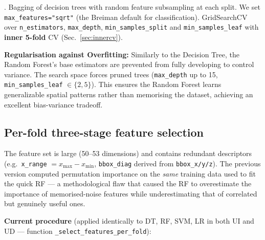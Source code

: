 \documentclass[11pt,a4paper]{article}
\begin{document}
\cite{breiman2001randomforests}. Bagging of decision trees with
random feature subsampling at each split. We set
\verb|max_features="sqrt"| (the Breiman default for classification).
GridSearchCV over \verb|n_estimators|, \verb|max_depth|, \verb|min_samples_split| and \verb|min_samples_leaf| with \textbf{inner 5-fold} CV
(Sec.~\ref{sec:innercv}).

\textbf{Regularisation against Overfitting:} Similarly to the Decision Tree, the Random Forest's base estimators are prevented from fully developing to control variance. The search space forces pruned trees (\verb|max_depth| up to 15, \verb|min_samples_leaf| $\in \{2, 5\}$). This ensures the Random Forest learns generalizable spatial patterns rather than memorising the dataset, achieving an excellent bias-variance tradeoff.

\subsection{Per-fold three-stage feature selection}\label{sec:perfold-fs}

The feature set is large (50--53 dimensions) and contains redundant
descriptors (e.g.\ \texttt{x\_range} $= x_{\max} - x_{\min}$,
\texttt{bbox\_diag} derived from \texttt{bbox\_x/y/z}).  The previous
version computed permutation importance on the \emph{same} training data
used to fit the quick RF --- a methodological flaw that caused the RF to
overestimate the importance of memorised-noise features while
underestimating that of correlated but genuinely useful ones.

\textbf{Current procedure} (applied identically to DT, RF, SVM, LR in
both UI and UD --- function \texttt{\_select\_features\_per\_fold}):
\end{document}
